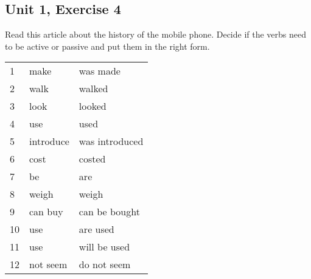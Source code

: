\subsection*{Unit 1, Exercise 4}
Read this article about the history of the mobile phone. Decide if the verbs need to be active or passive and put them in the right form.

\begin{answer}
\begin{tabular}{lll}
	1 & make & was made \\ 
	2 & walk & walked \\
	3 & look & looked \\
	4 & use & used \\
	5 & introduce & was introduced \\ 
	6 & cost & costed \\
	7 & be & are \\
	8 & weigh & weigh \\ 
	9 & can buy & can be bought \\
	10 & use & are used \\
	11 & use & will be used \\
	12 & not seem & do not seem \\ 
\end{tabular}
\end{answer}
